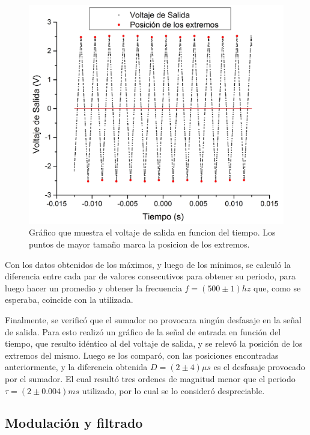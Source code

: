 \documentclass[11pt,a4paper]{article}
\begin{document}
\begin{figure}[h]
\centering
\includegraphics[scale=0.35]{Voltaje_de_Salida}
\caption{Gráfico que muestra el voltaje de salida en funcion del tiempo. Los puntos de mayor tamaño marca la posicion de los extremos.}
\label{fig:Vol_Sal}
\end{figure}

Con los datos obtenidos de los máximos, y luego de los mínimos, se calculó la diferencia entre cada par de valores consecutivos para obtener su periodo, para luego hacer un promedio y obtener la frecuencia $f= (500 \pm 1)hz$ que, como se esperaba, coincide con la utilizada.

Finalmente, se verificó que el sumador no provocara ningún desfasaje en la señal de salida. Para esto realizó un gráfico de la señal de entrada en función del tiempo, que resulto idéntico al del voltaje de salida, y se relevó la posición de los extremos del mismo. Luego se los comparó, con las posiciones encontradas anteriormente, y la diferencia obtenida $D= (2 \pm4)\mu s$ es el desfasaje provocado por el sumador. El cual resultó tres ordenes de magnitud menor que el periodo $\tau = (2 \pm 0.004)ms$ utilizado, por lo cual se lo consideró despreciable.


\subsection{Modulación y filtrado}
\end{document}
